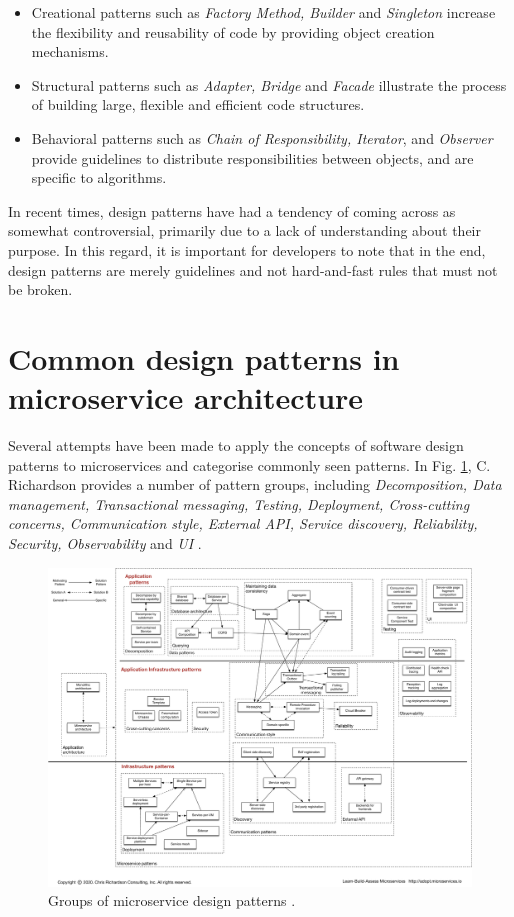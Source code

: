 \begin{itemize}
  \item Creational patterns such as \textit{Factory Method, Builder} and \textit{Singleton} increase the flexibility and reusability of code by providing object creation mechanisms.
  \item Structural patterns such as \textit{Adapter, Bridge} and \textit{Facade} illustrate the process of building large, flexible and efficient code structures.
  \item Behavioral patterns such as \textit{Chain of Responsibility, Iterator}, and \textit{Observer} provide guidelines to distribute responsibilities between objects, and are specific to algorithms. 
\end{itemize}

In recent times, design patterns have had a tendency of coming across as somewhat controversial, primarily due to a lack of understanding about their purpose. In this regard, it is important for developers to note that in the end, design patterns are merely guidelines and not hard-and-fast rules that must not be broken. 

\section{Common design patterns in microservice architecture}

Several attempts have been made to  apply the concepts of software design patterns to microservices and categorise commonly seen patterns. In Fig. \ref{fig:richardson-patterns}, C. Richardson provides a number of pattern groups, including \textit{Decomposition, Data management, Transactional messaging, Testing, Deployment, Cross-cutting concerns, Communication style, External API, Service discovery, Reliability, Security, Observability} and \textit{UI} \cite{richardson-patterns}.

\begin{figure}[h]
    \centering
  \includegraphics[width=1.0\linewidth]{./assets/images/related-work/richardson-patterns.pdf}
  \caption{Groups of microservice design patterns \cite{richardson-patterns}.}
  \label{fig:richardson-patterns}
\end{figure}

